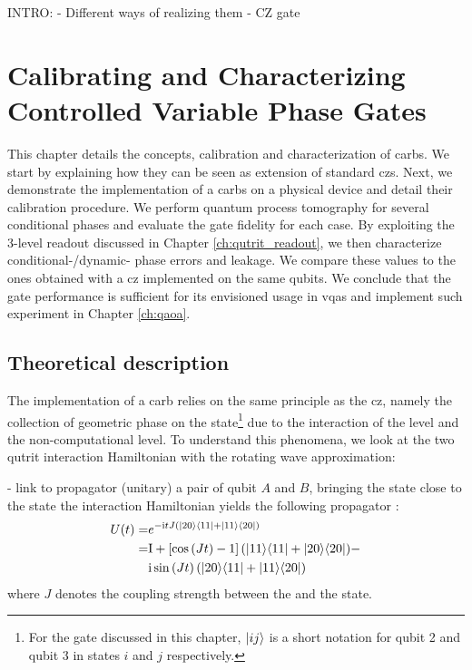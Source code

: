 INTRO: 
	- Different ways of realizing them
	- CZ gate


\chapter{Calibrating and Characterizing Controlled Variable Phase Gates}
This chapter details the concepts, calibration and characterization of \glspl{carb}. We start by explaining how they can be seen as extension of standard \glspl{cz}. Next, we demonstrate the implementation of a \glspl{carb} on a physical device and detail their calibration procedure. We perform quantum process tomography for several conditional phases and evaluate the gate fidelity for each case. By exploiting the 3-level readout discussed in Chapter \ref{ch:qutrit_readout}, we then characterize conditional-/dynamic- phase errors and leakage. We compare these values to the ones obtained with a \gls{cz} implemented on the same qubits.  We conclude that the gate performance is sufficient for its envisioned usage in \glspl{vqa} and implement such experiment in Chapter \ref{ch:qaoa}.


\section{Theoretical description} \label{sec:c_arb_theory}
The implementation of a \gls{carb} relies on the same principle as the \gls{cz}, namely the collection of geometric phase on the \oo state\footnote{For the gate discussed in this chapter, $\ket{ij}$ is a short notation for qubit 2 and qubit 3 in states $i$ and $j$ respectively.} due to the interaction of the \oo level and the non-computational \tz level\cite{Strauch2003QuantumQubits, DiCarlo2009DemonstrationProcessor}. To understand this phenomena, we look at the two qutrit interaction Hamiltonian with the rotating wave approximation:

- link to propagator (unitary)
a pair of qubit $A$ and $B$, bringing the \oo state close to the \tz state the interaction Hamiltonian yields the following propagator \cite[p.~87]{Heinsoo2018}: 
\begin{equation}
    \begin{aligned}
U(t)=& e^{-\mathrm i t J(|20\rangle\langle 11 |+|  11 \rangle \langle 20|)} \\
=& \mathrm{I}+\left[\cos \left(J t\right)-1\right](|11\rangle\langle 11|+| 20\rangle\langle 20|)-\\
& \mathrm i \sin \left(J t\right)(|20\rangle\langle 11|+| 11\rangle\langle 20|)
\end{aligned}
\end{equation}
 where $J$ denotes the coupling strength between the \oo and the \tz state.
 
